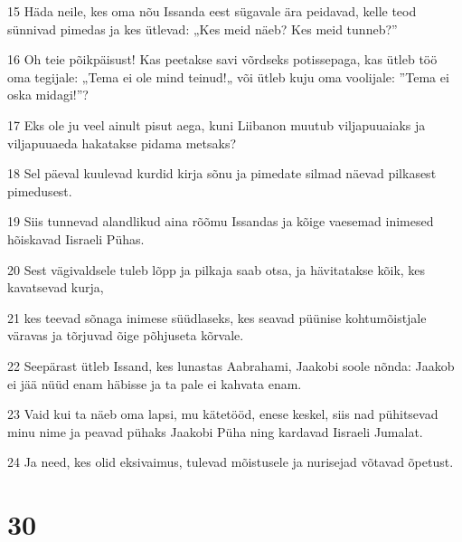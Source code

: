 \par 15 Häda neile, kes oma nõu Issanda eest sügavale ära peidavad, kelle teod sünnivad pimedas ja kes ütlevad: „Kes meid näeb? Kes meid tunneb?”
\par 16 Oh teie põikpäisust! Kas peetakse savi võrdseks potissepaga, kas ütleb töö oma tegijale: „Tema ei ole mind teinud!„ või ütleb kuju oma voolijale: ”Tema ei oska midagi!”?
\par 17 Eks ole ju veel ainult pisut aega, kuni Liibanon muutub viljapuuaiaks ja viljapuuaeda hakatakse pidama metsaks?
\par 18 Sel päeval kuulevad kurdid kirja sõnu ja pimedate silmad näevad pilkasest pimedusest.
\par 19 Siis tunnevad alandlikud aina rõõmu Issandas ja kõige vaesemad inimesed hõiskavad Iisraeli Pühas.
\par 20 Sest vägivaldsele tuleb lõpp ja pilkaja saab otsa, ja hävitatakse kõik, kes kavatsevad kurja,
\par 21 kes teevad sõnaga inimese süüdlaseks, kes seavad püünise kohtumõistjale väravas ja tõrjuvad õige põhjuseta kõrvale.
\par 22 Seepärast ütleb Issand, kes lunastas Aabrahami, Jaakobi soole nõnda: Jaakob ei jää nüüd enam häbisse ja ta pale ei kahvata enam.
\par 23 Vaid kui ta näeb oma lapsi, mu kätetööd, enese keskel, siis nad pühitsevad minu nime ja peavad pühaks Jaakobi Püha ning kardavad Iisraeli Jumalat.
\par 24 Ja need, kes olid eksivaimus, tulevad mõistusele ja nurisejad võtavad õpetust.

\chapter{30}

